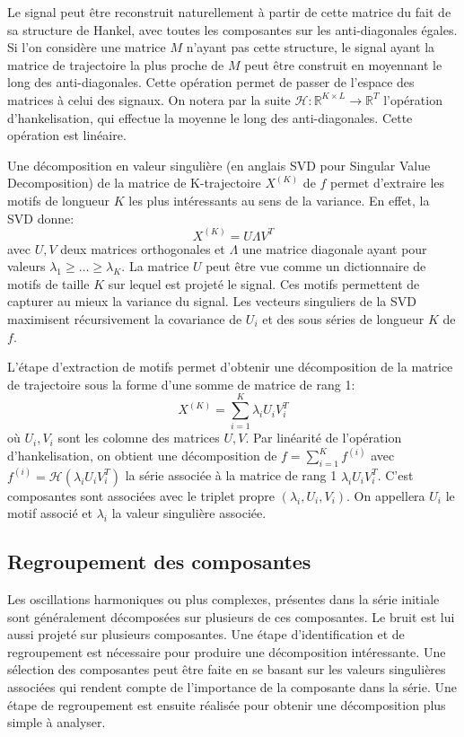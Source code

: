 \documentclass{gretsi}
\def\HH{\mathcal H}
\newcommand{\R}{\mathbb R}
\begin{document}
Le signal peut être reconstruit naturellement à partir de cette matrice du fait de sa structure de Hankel, avec toutes les composantes sur les anti-diagonales égales. Si l'on considère une matrice $M$ n'ayant pas cette structure, le signal ayant la matrice de trajectoire la plus proche de $M$ peut être construit en moyennant le long des anti-diagonales. Cette opération permet de  passer de l'espace des matrices à celui des signaux. On notera par la suite $\HH: \R^{K\times L} \to \R^T$ l'opération d'hankelisation, qui effectue la moyenne le long des anti-diagonales. Cette opération est linéaire.


Une décomposition en valeur singulière (en anglais SVD pour Singular Value Decomposition) de la matrice de K-trajectoire $X^{(K)}$ de $f$ permet d'extraire les motifs de longueur $K$ les plus intéressants au sens de la variance. En effet, la SVD donne: 
$$X^{(K)} = U \Lambda V^T
$$ avec $U, V$ deux matrices orthogonales et $\Lambda$ une matrice diagonale ayant pour valeurs $\lambda_1\ge \dots\ge \lambda_K$. La matrice $U$ peut être vue comme un dictionnaire de motifs de taille $K$ sur lequel est projeté le signal. Ces motifs permettent de capturer au mieux la variance du signal. Les vecteurs singuliers de la SVD maximisent récursivement la covariance de $U_i$ et des sous séries de longueur $K$ de $f$.



L'étape d'extraction de motifs permet d'obtenir une décomposition de la matrice de trajectoire sous la forme d'une somme de matrice de rang 1:$$
X^{(K)} = \sum_{i=1}^K \lambda_i U_iV_i^T 
$$où  $U_i, V_i$ sont les colomne des matrices $U, V$. Par linéarité de l'opération d'hankelisation, on obtient une décomposition de $f = \sum_{i=1}^K f^{(i)}$ avec $f^{(i)} = \HH(\lambda_iU_iV_i^T)$ la série associée à la matrice de rang 1 $\lambda_iU_iV_i^T$. C'est composantes sont associées avec le triplet propre $(\lambda_i, U_i, V_i)$. On appellera $U_i$ le motif associé et $\lambda_i$ la valeur singulière associée.


\subsection{Regroupement des composantes}
\label{sub:grp}

Les oscillations harmoniques ou plus complexes, présentes dans la série initiale sont généralement décomposées sur plusieurs de ces composantes. Le bruit est lui aussi projeté sur plusieurs composantes. Une étape d'identification et de regroupement est nécessaire pour produire une décomposition intéressante. Une sélection des composantes peut être faite en se basant sur les valeurs singulières associées qui rendent compte de l'importance de la composante dans la série. Une étape de regroupement est ensuite réalisée pour obtenir une décomposition plus simple à analyser.
\end{document}
